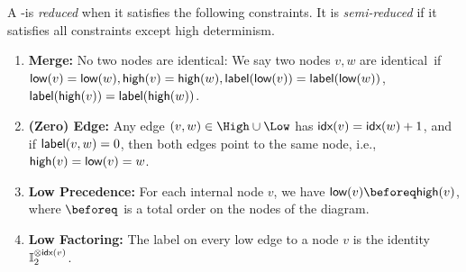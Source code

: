 \begin{definition}
	\label{def:reduced-limdd}
	A \pauli-\limdd is \emph{reduced} when it satisfies the following constraints.
	It is \emph{semi-reduced} if it satisfies all constraints except high determinism.
	\begin{enumerate}
		\item \textbf{Merge: } No two nodes are identical: We say
            two nodes $v,w$ are identical~if $\low v= \low w, \high v = \high w,
                \lbl(\low v)=\lbl(\low w)$, $\lbl(\high v)=\lbl(\high w)$.
		\item \textbf{(Zero) Edge: } Any edge $(v,w) \in \High \cup \Low $
has $\index(v) = \index(w) + 1$, and if $\lbl(v,w)=0$, then both edges point to the same node, i.e., $\high v = \low v = w$.
		\item \textbf{Low Precedence: } For each internal node $v$, we have $\low v \beforeq \high v$, where  $\beforeq$ is a total order on the nodes of the diagram.
		\item \textbf{Low Factoring: } The label on every low edge to a node $v$ is the identity $\id[2]^{\otimes\index(v)}$.

\end{enumerate}
\end{definition}
